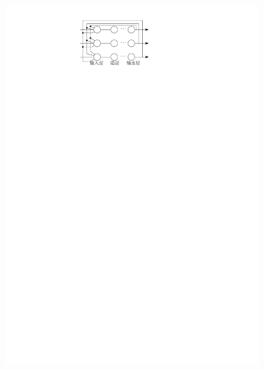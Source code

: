 \begin{note}
\begin{itemize}
\begin{figure}[htbp]
            \includegraphics{image/有反馈型.pdf}
        \end{figure}
    \end{itemize}
\end{note}
